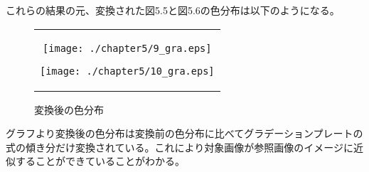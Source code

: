 \newpage
これらの結果の元、変換された図5.5と図5.6の色分布は以下のようになる。
\begin{figure}[htbp]
  \begin{center}
    \begin{tabular}{c}

      \begin{minipage}{0.45\hsize}
        \begin{center}
          \texttt{[image: ./chapter5/9\_gra.eps]}
          \caption{変換後の色分布}
          \label{fig:seininhsv}
        \end{center}
      \end{minipage}

      \begin{minipage}{0.45\hsize}
        \begin{center}
          \texttt{[image: ./chapter5/10\_gra.eps]}
          \caption{変換後の色分布}
          \label{fig:kinninhsv}
        \end{center}
      \end{minipage}


    \end{tabular}
  \end{center}
\end{figure}
 
グラフより変換後の色分布は変換前の色分布に比べてグラデーションプレートの式の傾き分だけ変換されている。これにより対象画像が参照画像のイメージに近似することができていることがわかる。


\newpage
